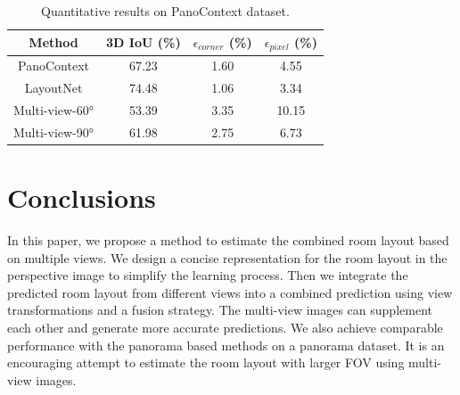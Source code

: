 

\begin{table}
	\caption{Quantitative results on PanoContext dataset.}
	\label{tab:PC}
	\begin{tabular}{cccc}
		\toprule
		Method&3D IoU (\%)& $\epsilon_{corner}$ (\%) & $\epsilon_{pixel}$ (\%)\\
		\midrule
		PanoContext \cite{zhang2014panocontext} & 67.23 & 1.60 & 4.55\\
		LayoutNet \cite{zou2018layoutnet} & 74.48 & 1.06 & 3.34\\
		Multi-view-\ang{60} & 53.39 & 3.35 & 10.15\\	
		Multi-view-\ang{90} & 61.98 & 2.75 & 6.73\\	
		\bottomrule
	\end{tabular}
\end{table}

\section{Conclusions}
In this paper, we propose a method to estimate the combined room layout based on multiple views. We design a concise representation for the room layout in the perspective image to simplify the learning process. Then we integrate the predicted room layout from different views into a combined prediction using view transformations and a fusion strategy. The multi-view images can supplement each other and generate more accurate predictions. We also achieve comparable performance with the panorama based methods on a panorama dataset. It is an encouraging attempt to estimate the room layout with larger FOV using multi-view images.


